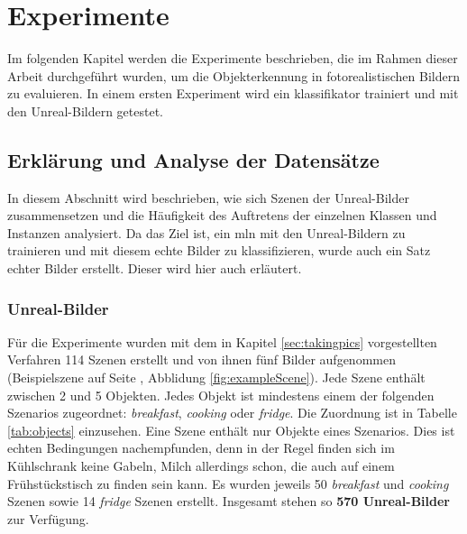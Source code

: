 \graphicspath{{./images/}}      
\def\CHAPTERONE{./chapters/Chapter-1} 

\chapter{Experimente}
\label{chap:experiments}
%	
\glsresetall
{}Im folgenden Kapitel werden die Experimente beschrieben, die im Rahmen dieser Arbeit durchgeführt wurden, um die Objekterkennung in fotorealistischen Bildern zu evaluieren.
In einem ersten Experiment wird ein \gls{klassifikator} trainiert und mit den Unreal-Bildern getestet. 

\section{Erklärung und Analyse der Datensätze}

In diesem Abschnitt wird beschrieben, wie sich Szenen der Unreal-Bilder zusammensetzen und die Häufigkeit des Auftretens der einzelnen Klassen und Instanzen analysiert. Da das Ziel ist, ein \gls{mln} mit den Unreal-Bildern zu trainieren und mit diesem echte Bilder zu klassifizieren, wurde auch ein Satz echter Bilder erstellt. Dieser wird hier auch erläutert.

\subsection{Unreal-Bilder}  
Für die Experimente wurden mit dem in Kapitel \ref{sec:takingpics} vorgestellten Verfahren 114 Szenen erstellt und von ihnen fünf Bilder aufgenommen (Beispielszene auf Seite \pageref{fig:exampleScene}, Abblidung \ref{fig:exampleScene}). Jede Szene enthält zwischen 2 und 5 Objekten. Jedes Objekt ist mindestens einem der folgenden Szenarios zugeordnet: \textit{breakfast}, \textit{cooking} oder \textit{fridge}. Die Zuordnung ist in Tabelle \ref{tab:objects} einzusehen. Eine Szene enthält nur Objekte eines Szenarios. Dies ist echten Bedingungen nachempfunden, denn in der Regel finden sich im Kühlschrank keine Gabeln, Milch allerdings schon, die auch auf einem Frühstückstisch zu finden sein kann. Es wurden jeweils 50 \textit{breakfast} und \textit{cooking} Szenen sowie 14 \textit{fridge} Szenen erstellt. Insgesamt stehen so \textbf{570 Unreal-Bilder} zur Verfügung. \par



